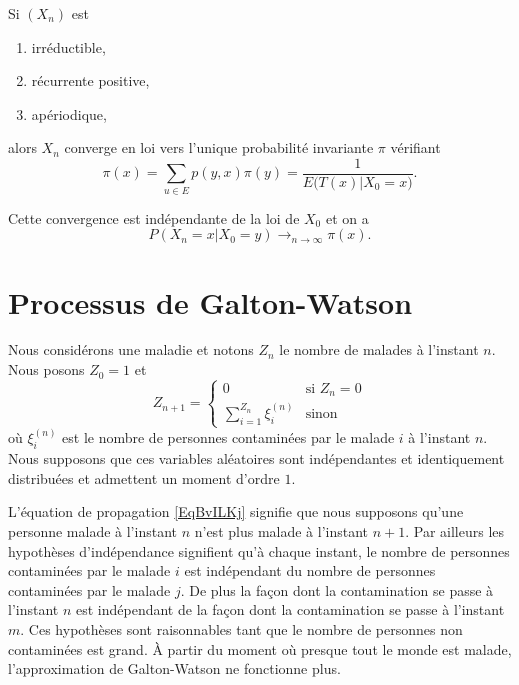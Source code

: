 \begin{theorem}
    Si \( (X_n)\) est
    \begin{enumerate}
        \item
            irréductible,
        \item
            récurrente positive,
        \item
            apériodique,
    \end{enumerate}
    alors \( X_n\) converge en loi vers l'unique probabilité invariante \( \pi\) vérifiant
    \begin{equation}
        \pi(x)=\sum_{u\in E}p(y,x)\pi(y)=\frac{1}{ E\big( T(x)|X_0=x \big) }.
    \end{equation}

    Cette convergence est indépendante de la loi de \( X_0\) et on a
    \begin{equation}
        P(X_n=x|X_0=y)\to_{n\to \infty} \pi(x).
    \end{equation}
\end{theorem}

\section{Processus de Galton-Watson}
\label{SecBPmrPdtGalton}

Nous considérons une maladie et notons \( Z_n\) le nombre de malades à l'instant \( n\). Nous posons \( Z_0=1\) et
\begin{equation}        \label{EqBvILKj}
    Z_{n+1}=\begin{cases}
        0    &   \text{si } Z_n=0\\
        \sum_{i=1}^{Z_n}\xi_i^{(n)}    &    \text{sinon}
    \end{cases}
\end{equation}
où \( \xi_i^{(n)}\) est le nombre de personnes contaminées par le malade \(i\) à l'instant \( n\). Nous supposons que ces variables aléatoires sont indépendantes et identiquement distribuées et admettent un moment d'ordre \( 1\).

L'équation de propagation \ref{EqBvILKj} signifie que nous supposons qu'une personne malade à l'instant \( n\) n'est plus malade à l'instant \( n+1\). Par ailleurs les hypothèses d'indépendance signifient qu'à chaque instant, le nombre de personnes contaminées par le malade \( i\) est indépendant du nombre de personnes contaminées par le malade \( j\). De plus la façon dont la contamination se passe à l'instant \( n\) est indépendant de la façon dont la contamination se passe à l'instant \( m\). Ces hypothèses sont raisonnables tant que le nombre de personnes non contaminées est grand. À partir du moment où presque tout le monde est malade, l'approximation de Galton-Watson ne fonctionne plus.

